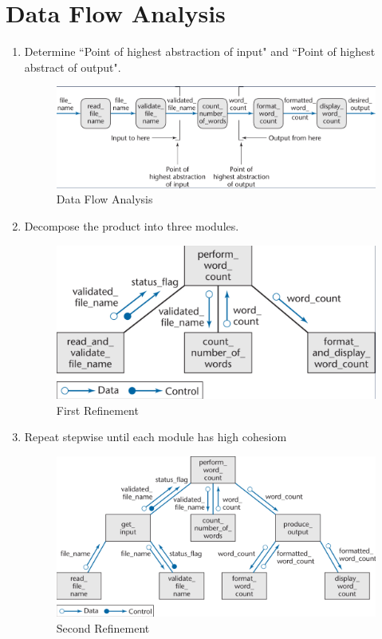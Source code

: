 \documentclass[11pt]{article}
\begin{document}
\newpage
\section*{Data Flow Analysis}

\begin{enumerate}

	\item Determine ``Point of highest abstraction of input" and ``Point of highest abstract of output".
	
	\begin{figure}[h]
		\centering
		\includegraphics[width=0.8\linewidth]{images/DataFlowAnalysis.png}
		\caption{Data Flow Analysis}
		\label{fig:DataFlowAnalysis}
	\end{figure}
	
	\item Decompose the product into three modules.
	
	\begin{figure}[h]
		\centering
		\includegraphics[width=0.8\linewidth]{images/FirstRefinements.png}
		\caption{First Refinement}
		\label{fig:FirstRefinements}
	\end{figure}
	
	\item Repeat stepwise until each module has high cohesiom

	\begin{figure}[h]
		\centering
		\includegraphics[width=0.8\linewidth]{images/SecondRefinements.png}
		\caption{Second Refinement}
		\label{fig:SecondRefinements}
	\end{figure}

\end{enumerate}
\end{document}
